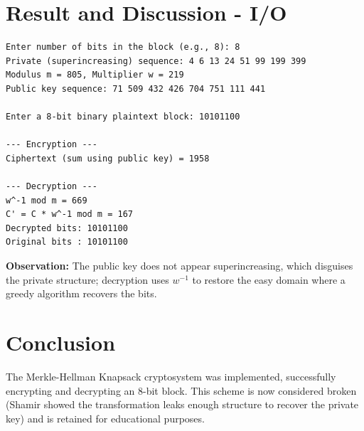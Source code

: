 \section{Result and Discussion - I/O}
\begin{verbatim}
Enter number of bits in the block (e.g., 8): 8
Private (superincreasing) sequence: 4 6 13 24 51 99 199 399
Modulus m = 805, Multiplier w = 219
Public key sequence: 71 509 432 426 704 751 111 441

Enter a 8-bit binary plaintext block: 10101100

--- Encryption ---
Ciphertext (sum using public key) = 1958

--- Decryption ---
w^-1 mod m = 669
C' = C * w^-1 mod m = 167
Decrypted bits: 10101100
Original bits : 10101100
\end{verbatim}

\textbf{Observation:} The public key does not appear superincreasing, which
disguises the private structure; decryption uses $w^{-1}$ to restore the
easy domain where a greedy algorithm recovers the bits.

\section{Conclusion}
The Merkle-Hellman Knapsack cryptosystem was implemented, successfully
encrypting and decrypting an 8-bit block. This scheme is now considered
broken (Shamir showed the transformation leaks enough structure to recover
the private key) and is retained for educational purposes.
